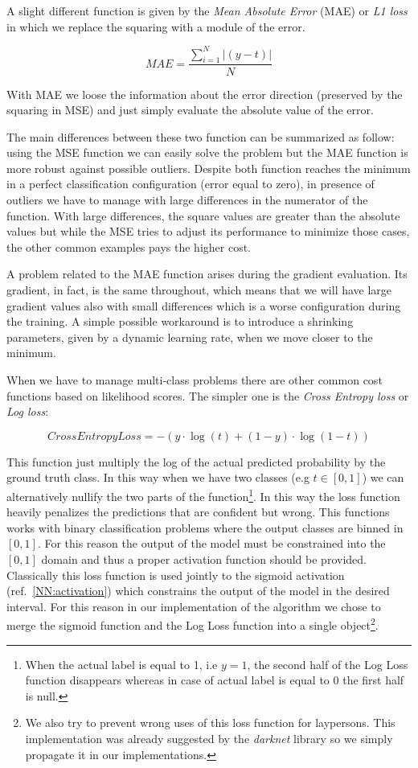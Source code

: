 \documentclass{standalone}
\begin{document}
A slight different function is given by the \emph{Mean Absolute Error} (MAE) or \emph{L1 loss} in which we replace the squaring with a module of the error.

$$
MAE = \frac{\sum_{i=1}^{N}|\left( y - t \right)|}{N}
$$

With MAE we loose the information about the error direction (preserved by the squaring in MSE) and just simply evaluate the absolute value of the error.

The main differences between these two function can be summarized as follow: using the MSE function we can easily solve the problem but the MAE function is more robust against possible outliers.
Despite both function reaches the minimum in a perfect classification configuration (error equal to zero), in presence of outliers we have to manage with large differences in the numerator of the function.
With large differences, the square values are greater than the absolute values but while the MSE tries to adjust its performance to minimize those cases, the other common examples pays the higher cost.

A problem related to the MAE function arises during the gradient evaluation.
Its gradient, in fact, is the same throughout, which means that we will have large gradient values also with small differences which is a worse configuration during the training.
A simple possible workaround is to introduce a shrinking parameters, given by a dynamic learning rate, when we move closer to the minimum.

When we have to manage multi-class problems there are other common cost functions based on likelihood scores.
The simpler one is the \emph{Cross Entropy loss} or \emph{Log loss}:

$$
CrossEntropyLoss = -(y\cdot\log(t) + (1 - y)\cdot\log(1 - t))
$$

This function just multiply the log of the actual predicted probability by the ground truth class.
In this way when we have two classes (e.g $t \in [0, 1]$) we can alternatively nullify the two parts of the function\footnote{
  When the actual label is equal to 1, i.e $y=1$, the second half of the Log Loss function disappears whereas in case of actual label is equal to 0 the first half is null.
}.
In this way the loss function heavily penalizes the predictions that are confident but wrong.
This functions works with binary classification problems where the output classes are binned in $[0, 1]$.
For this reason the output of the model must be constrained into the $[0, 1]$ domain and thus a proper activation function should be provided.
Classically this loss function is used jointly to the sigmoid activation (ref.~\ref{NN:activation}) which constrains the output of the model in the desired interval.
For this reason in our implementation of the algorithm we chose to merge the sigmoid function and the Log Loss function into a single object\footnote{
  We also try to prevent wrong uses of this loss function for laypersons.
  This implementation was already suggested by the \emph{darknet} library so we simply propagate it in our implementations.
}.
\end{document}
